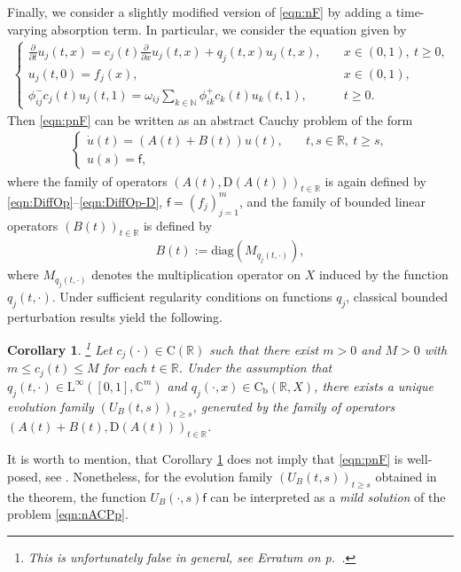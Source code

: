 \documentclass[a4paper,oneside,10pt]{amsart}
\newtheorem{corollary}[theorem]{Corollary}
\theoremstyle{definition}
\numberwithin{equation}{section}
\def\dom{\mathrm{D}}
\def\CC{\mathbb{C}}
\def\RR{\mathbb{R}}
\begin{document}
Finally, we consider a slightly modified version of \eqref{eqn:nF} by adding a time-varying absorption term. In particular, we consider the equation given by
\begin{align}\label{eqn:pnF}
\tag{pnF}
\begin{cases}
\frac{\partial}{\partial t}u_j(t,x)=c_j(t)\frac{\partial}{\partial x}u_j(t,x)+q_j(t,x)u_j(t,x),&\quad x\in\left(0,1\right),\ t\geq 0,\\
u_j(t,0)= f_j(x),&\quad x\in\left(0,1\right),\\ 
\phi^-_{ij}c_j(t)u_j(t,1)=\omega_{ij}\sum_{k\in\mathbb{N}}{\phi^+_{ik}c_k(t)u_k(t,1)},&\quad t\geq0.
\end{cases}
\end{align}
Then \eqref{eqn:pnF} can be written as an abstract Cauchy problem of the form
\begin{align}\label{eqn:nACPp}
\begin{cases}
\dot{u}(t)=(A(t)+B(t))u(t),&\quad t,s\in\RR,\ t\geq s,\\
u(s)=\mathsf{f},
\end{cases}
\end{align}
where the family of operators $(A(t),\dom(A(t)))_{t\in\RR}$ is again defined by \eqref{eqn:DiffOp}--\eqref{eqn:DiffOp-D}, $\mathsf{f} = (f_j)_{j=1}^m$,  and the family of bounded linear operators $(B(t))_{t\in\RR}$ is defined by
\begin{align}
B(t):=\mathrm{diag}(M_{{ q_j(t,\cdot)}}),
\end{align}
where $M_{{ q_j(t,\cdot)}}$ denotes the multiplication operator { on $X$ induced by the function $q_j(t,\cdot)$. Under sufficient regularity conditions on functions $q_j$, classical bounded perturbation results \cite[Cor.~VI.9.20]{EN} yield the following.}

\begin{corollary}\label{thm:PertNonAutFlow}\footnote{This is unfortunately false in general, see Erratum on p.~\pageref{erratum}.}
Let $c_j(\cdot)\in\mathrm{C}(\RR)$ such that there exist {$m>0$ and $M>0$} with $m\leq c_j(t)\leq M$ for each $t\in\RR$. Under the assumption that $q_j(t,\cdot)\in\mathrm{L}^{\infty}\left(\left[0,1\right],\CC^m\right)$ and $q_j(\cdot,x)\in\mathrm{C}_\mathrm{b}(\RR,X)$, there exists a unique  evolution family $(U_B(t,s))_{t\geq s}$, generated by the family of operators $(A(t)+B(t),\dom(A(t)))_{t\in\RR}$.
\end{corollary}

It is worth to mention, that Corollary \ref{thm:PertNonAutFlow} does not imply that \eqref{eqn:pnF} is well-posed, see  \cite[Ex.~VI.9.21]{EN}. Nonetheless, for the evolution family  $(U_B(t,s))_{t\geq s}$ obtained in the theorem, the function  $U_B(\cdot,s)\mathsf{f}$ can be interpreted as a \emph{mild solution} of the problem \eqref {eqn:nACPp}.
\end{document}
